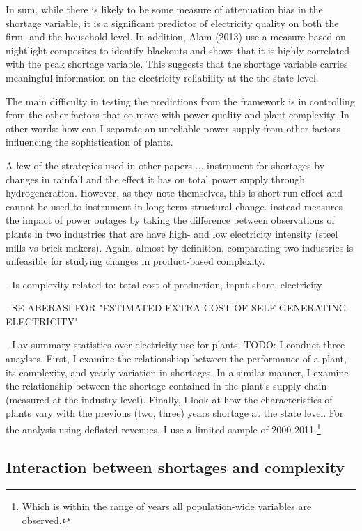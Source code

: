 \documentclass[11pt]{article}
\begin{document}
In sum, while there is likely to be some measure of attenuation bias in the shortage variable, it is a significant predictor of electricity quality on both the firm- and the household level. In addition, Alam (2013) use a measure based on nightlight composites to identify blackouts and shows that it is highly correlated with the peak shortage variable. This suggests that the shortage variable carries meaningful information on the electricity reliability at the the state level.

The main difficulty in testing the predictions from the framework is in controlling from the other factors that co-move with power quality and plant complexity. In other words: how can I separate an unreliable power supply from other factors influencing the sophistication of plants. 

A few of the strategies used in other papers ...  \cite{allcott_how_2016} instrument for shortages by changes in rainfall and the effect it has on total power supply through hydrogeneration. However, as they note themselves, this is short-run effect and cannot be used to instrument in long term structural change.  \cite{alam_coping_2013} instead measures the impact of power outages by taking the difference between observations of plants in two industries that are have high- and low electricity intensity (steel mills vs brick-makers). Again, almost by definition, comparating two industries is unfeasible for studying changes in product-based complexity.

- Is complexity related to: total cost of production, input share, electricity 

- SE ABERASI FOR "ESTIMATED EXTRA COST OF SELF GENERATING ELECTRICITY"

- Lav summary statistics over electricity use for plants.
TODO: I conduct three anaylses. First, I examine the relationshiop between the performance of a plant, its complexity, and yearly variation in shortages. In a similar manner, I examine the relationship between the shortage contained in the plant's supply-chain (measured at the industry level). Finally, I look at how the characteristics of plants vary with the previous (two, three) years shortage at the state level. For the analysis using deflated revenues, I use a limited sample of 2000-2011.\footnote{Which is within the range of years all population-wide variables are observed.} 

\subsection{Interaction between shortages and complexity}%
\label{sub:regressions}
\end{document}
